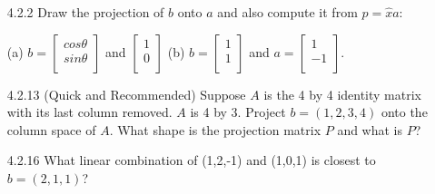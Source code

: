\documentclass[10pt,twoside,reqno]{article}
\begin{document}
\begin{enumerate}
\item[4.2.2] Draw the projection of $b$ onto $a$ and also compute it from $p = \hat{x}a$: \\
\begin{center}
(a) 
$
b=
\begin{bmatrix}
cos\theta\\
sin\theta\\
\end{bmatrix}
$
\hspace{3mm}and\hspace{3mm}
$
\begin{bmatrix}
1\\
0\\
\end{bmatrix}
$
\hspace{8mm}(b) 
$
b=
\begin{bmatrix}
1\\
1\\
\end{bmatrix}
$
\hspace{3mm}and\hspace{3mm}
$
a=
\begin{bmatrix}
1\\
-1\\
\end{bmatrix}
$. \\
\end{center}
\vspace{3mm}

\vspace{3mm}
\item[4.2.13] (Quick and Recommended) Suppose $A$ is the 4 by 4 identity matrix with its last column removed. $A$ is 4 by 3. Project $b = (1,2,3,4)$ onto the column space of $A$. What shape is the projection matrix $P$ and what is $P$? \\
\vspace{3mm}

\vspace{3mm}
\item[4.2.16] What linear combination of (1,2,-1) and (1,0,1) is closest to $b = (2, 1, 1)$? \\
\vspace{3mm}


\end{enumerate}
\end{document}
